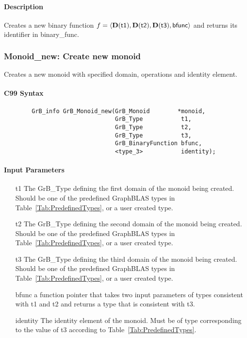 \paragraph{Description}

Creates a new binary function $f = \langle \bold{D}({\sf t1}), \bold{D}({\sf t2}),
 \bold{D}({\sf t3}), {\sf bfunc} \rangle$ and returns its identifier in {\sf binary\_func}.


\subsubsection{{\sf Monoid\_new}: Create new monoid}

Creates a new monoid with specified domain, operations and identity element.

\paragraph{C99 Syntax}

\begin{verbatim}
        GrB_info GrB_Monoid_new(GrB_Monoid        *monoid,
                                GrB_Type           t1,
                                GrB_Type           t2,
                                GrB_Type           t3,
                                GrB_BinaryFunction bfunc,
                                <type_3>           identity);
\end{verbatim}

\paragraph{Input Parameters}

\begin{itemize}[leftmargin=1.1in]
    \item[{\sf t1}] The {\sf GrB\_Type} defining the first domain of the monoid being created. 
    Should be one of the predefined
    GraphBLAS types in Table~\ref{Tab:PredefinedTypes}, or a user created type.
    \item[{\sf t2}] The {\sf GrB\_Type} defining the second domain of the monoid being
     created. Should be one of the predefined
    GraphBLAS types in Table~\ref{Tab:PredefinedTypes}, or a user created type.
    \item[{\sf t3}] The {\sf GrB\_Type} defining the third domain of the monoid being created. 
    Should be one of the predefined
    GraphBLAS types in Table~\ref{Tab:PredefinedTypes}, or a user created type.
    \item[{\sf bfunc}] a function pointer that takes two input parameters of types consistent
    with t1 and t2 and returns a type that is consistent with t3.
    \item[{\sf identity}] The identity element of the monoid. 
    Must be of type corresponding to the value of {\sf t3} according to
    Table~\ref{Tab:PredefinedTypes}.
\end{itemize}

